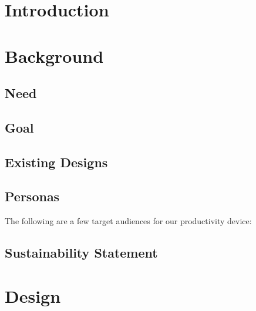 \documentclass{article}
\begin{document}
\maketitle
\newpage

\section{Introduction}




\newpage

\tableofcontents
\newpage

\section{Background}

\subsection{Need}


\subsection{Goal}


\subsection{Existing Designs}


\subsection{Personas}
The following are a few target audiences for our productivity device:






\subsection{Sustainability Statement}


\newpage

\section{Design}
\end{document}
